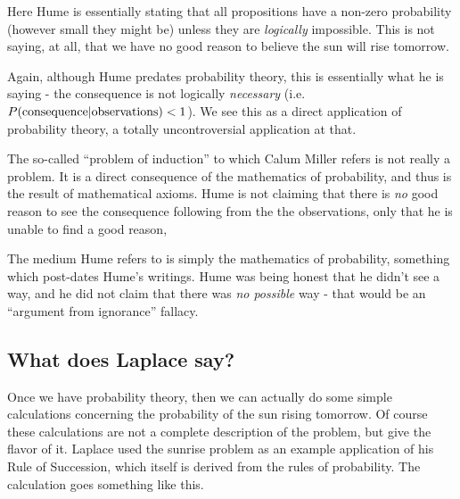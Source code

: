 \documentclass{tufte-book}
\begin{document}
Here Hume is essentially stating that all propositions have a non-zero
probability (however small they might be) unless they are
\emph{logically} impossible. This is not saying, at all, that we have no
good reason to believe the sun will rise tomorrow.


Again, although Hume predates probability theory, this is essentially
what he is saying - the consequence is not logically \emph{necessary}
(i.e. \(P({\rm consequence}|{\rm observations})<1\)). We see this as a
direct application of probability theory, a totally uncontroversial
application at that.

The so-called ``problem of induction'' to which Calum Miller refers is
not really a problem. It is a direct consequence of the mathematics of
probability, and thus is the result of mathematical axioms. Hume is not
claiming that there is \emph{no} good reason to see the consequence
following from the the observations, only that he is unable to find a
good reason,


The medium Hume refers to is simply the mathematics of probability,
something which post-dates Hume's writings. Hume was being honest that
he didn't see a way, and he did not claim that there was \emph{no
possible} way - that would be an ``argument from ignorance'' fallacy.

\subsection{What does Laplace say?}

Once we have probability theory, then we can actually do some simple
calculations concerning the probability of the sun rising tomorrow. Of
course these calculations are not a complete description of the problem,
but give the flavor of it. Laplace used the sunrise problem as an
example application of his Rule of Succession, which itself is derived
from the rules of probability. The calculation goes something like this.
\end{document}
